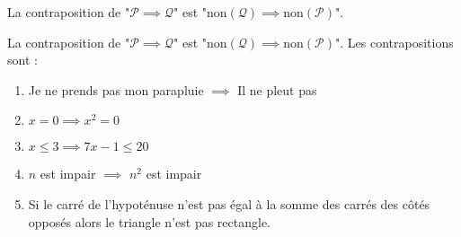\documentclass[11pt,class=report,crop=false]{standalone}
\begin{document}
\indication
La contraposition de "$\mathcal{P} \implies \mathcal{Q}$" est
"$\text{non}(\mathcal{Q}) \implies \text{non}(\mathcal{P})$".
\finindication

\correction
La contraposition de "$\mathcal{P} \implies \mathcal{Q}$" est
"$\text{non}(\mathcal{Q}) \implies \text{non}(\mathcal{P})$".
Les contrapositions sont :
\begin{enumerate}
    \item Je ne prends pas mon parapluie $\implies$ Il ne pleut pas
    \item $x = 0\implies x^2 = 0$ 
    \item $x \le 3 \implies 7x-1 \le 20$ 
    \item $n$ est impair $\implies$ $n^2$ est impair
    \item Si le carré de l'hypoténuse n'est pas égal à la somme des carrés des côtés opposés alors le triangle n'est pas rectangle.
\end{enumerate} 
\fincorrection
\finexercice
\end{document}

